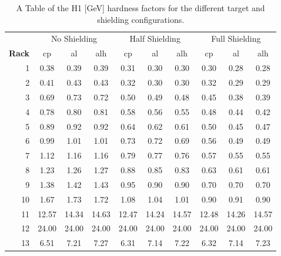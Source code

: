 \begin{table}[htbp]
\centering
\begin{tabular}{r|c|c|c|c|c|c|c|c|c}
& \multicolumn{3}{c|}{No Shielding} & \multicolumn{3}{c|}{Half Shielding} & \multicolumn{3}{c}{Full Shielding} \\ \cline{2-10}
\textbf{Rack}  & cp    & al    & alh   & cp    & al    & alh & cp    & al    & alh\\ 
\hline
1  &     0.38 &     0.39 &      0.39 &     0.31 &     0.30 &      0.30 &     0.30 &     0.28 &      0.28 \\
2  &     0.41 &     0.43 &      0.43 &     0.32 &     0.30 &      0.30 &     0.32 &     0.29 &      0.29 \\
3  &     0.69 &     0.73 &      0.72 &     0.50 &     0.49 &      0.48 &     0.45 &     0.38 &      0.39 \\
4  &     0.78 &     0.80 &      0.81 &     0.58 &     0.56 &      0.55 &     0.48 &     0.44 &      0.42 \\
5  &     0.89 &     0.92 &      0.92 &     0.64 &     0.62 &      0.61 &     0.50 &     0.45 &      0.47 \\
6  &     0.99 &     1.01 &      1.01 &     0.73 &     0.72 &      0.69 &     0.56 &     0.49 &      0.49 \\
7  &     1.12 &     1.16 &      1.16 &     0.79 &     0.77 &      0.76 &     0.57 &     0.55 &      0.55 \\
8  &     1.23 &     1.26 &      1.27 &     0.88 &     0.85 &      0.83 &     0.63 &     0.61 &      0.61 \\
9  &     1.38 &     1.42 &      1.43 &     0.95 &     0.90 &      0.90 &     0.70 &     0.70 &      0.70 \\
10 &     1.67 &     1.73 &      1.72 &     1.08 &     1.04 &      1.01 &     0.90 &     0.91 &      0.90 \\
11 &    12.57 &    14.34 &     14.63 &    12.47 &    14.24 &     14.57 &    12.48 &    14.26 &     14.57 \\
12 &    24.00 &    24.00 &     24.00 &    24.00 &    24.00 &     24.00 &    24.00 &    24.00 &     24.00 \\
13 &     6.51 &     7.21 &      7.27 &     6.31 &     7.14 &      7.22 &     6.32 &     7.14 &      7.23 \\
\end{tabular}
\caption{A Table of the H1 [GeV] hardness factors for the different target and shielding configurations.}
\label{tab:hardness1}
\end{table}

